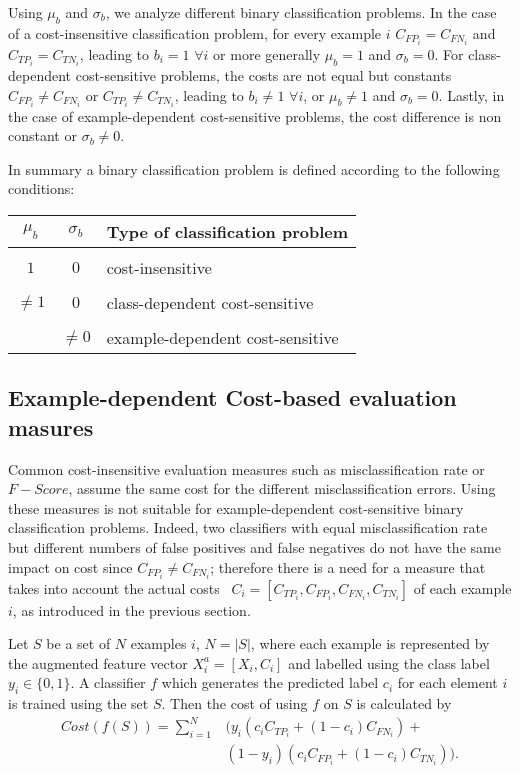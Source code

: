 	  Using $\mu_b$ and $\sigma_b$, we analyze different binary classification problems. In the case 
		of a cost-insensitive classification problem, for every example $i$ \mbox{$C_{FP_i}=C_{FN_i}$}
	  and $C_{TP_i}=C_{TN_i}$, leading to $b_i=1$ $\forall i$ or more generally $\mu_b=1$ and 
		$\sigma_b=0$. For class-dependent cost-sensitive problems, the costs are not equal but 
		constants \mbox{$C_{FP_i}\ne C_{FN_i}$} or \mbox{$C_{TP_i}\ne C_{TN_i}$}, leading to $b_i \ne 
		1$ $\forall i$, or $\mu_b \ne 1$ and $\sigma_b=0$. Lastly, in the case of example-dependent 
		cost-sensitive problems, the cost difference is non constant or $\sigma_b \ne 0$.
  
	  In summary a binary classification problem is defined according to the following conditions:
		\begin{table}[h]
			\centering
      \begin{tabular}{c | c | l}
			  $\mu_b$ & $\sigma_b$ & Type of classification problem \\
			  \hline 
			  && \\
			  $1$ &  $0$ & cost-insensitive \\ &&\\
			  $\ne 1$ & $0$ & class-dependent cost-sensitive \\ &&\\
			  & $\ne 0$ & example-dependent cost-sensitive \\ 
			\end{tabular}
    \end{table}

\subsection{Example-dependent Cost-based evaluation masures}
	  Common cost-insensitive evaluation measures such as misclassification rate or \mbox{$F-Score$}, 
	  assume the same cost for the different misclassification errors. Using these measures is not 
	  suitable for example-dependent cost-sensitive binary classification problems. Indeed, two 
		classifiers with equal misclassification rate but different numbers of false positives and 
	  false negatives do not have the same impact on cost since \mbox{$C_{FP_i}\ne C_{FN_i}$};
	  therefore there is a need for a measure that takes into account the actual costs 
	  ~$C_i=[C_{TP_i},C_{FP_i},C_{FN_i},C_{TN_i}]$ of each example $i$, as introduced in 
		the previous section.
  
	  Let $S$ be a set of $N$ examples $i$, $N=\vert S \vert$, where each example is represented by 
		the augmented feature vector \mbox{$X^a_i=[X_i, C_i]$} and labelled using the class label $y_i 
		\in \{0,1\}$.
 	  A classifier $f$ which generates the predicted label $c_i$ for each element $i$ is trained 
		using the set $S$. Then the cost of using $f$ on $S$ is calculated by
		\begin{align}\label{eq:cost}
	  	Cost(f(S)) = \sum_{i=1}^{N} & {\bigg( y_i(c_i C_{TP_i} + (1-c_i)C_{FN_i})} + \\
			& {(1-y_i)(c_i C_{FP_i} + (1-c_i)C_{TN_i}) \bigg)}.
		\end{align}

